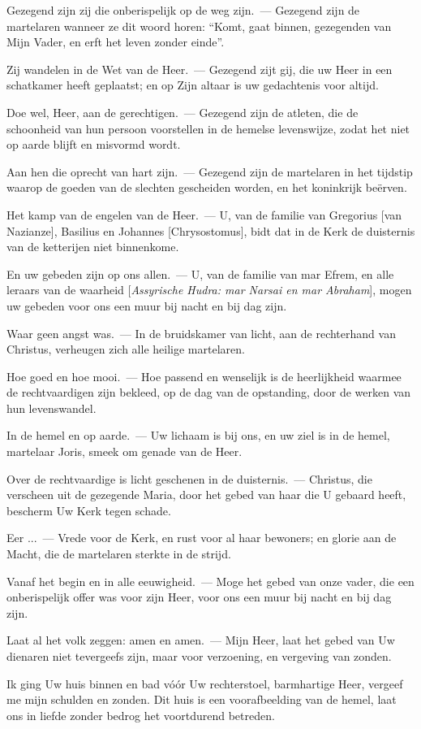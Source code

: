\documentclass[12pt,twoside,a5paper]{article}
\begin{document}
\begin{halfparskip}
  Gezegend zijn zij die onberispelijk op de weg zijn.~--- Gezegend zijn de martelaren wanneer ze dit woord horen: ``Komt, gaat binnen, gezegenden van Mijn Vader, en erft het leven zonder einde''.

  Zij wandelen in de Wet van de Heer.~--- Gezegend zijt gij, die uw Heer in een schatkamer heeft geplaatst; en op Zijn altaar is uw gedachtenis voor altijd.

  Doe wel, Heer, aan de gerechtigen.~--- Gezegend zijn de atleten, die de schoonheid van hun persoon voorstellen in de hemelse levenswijze, zodat het niet op aarde blijft en misvormd wordt.

  Aan hen die oprecht van hart zijn.~--- Gezegend zijn de martelaren in het tijdstip waarop de goeden van de slechten gescheiden worden, en het koninkrijk beërven.

  Het kamp van de engelen van de Heer.~--- U, van de familie van Gregorius [van Nazianze], Basilius en Johannes [Chrysostomus], bidt dat in de Kerk de duisternis van de ketterijen niet binnenkome.

  En uw gebeden zijn op ons allen.~--- U, van de familie van mar Efrem, en alle leraars van de waarheid [\emph{Assyrische Hudra: mar Narsai en mar Abraham}], mogen uw gebeden voor ons een muur bij nacht en bij dag zijn.

  Waar geen angst was.~--- In de bruidskamer van licht, aan de rechterhand van Christus, verheugen zich alle heilige martelaren.

  Hoe goed en hoe mooi.~--- Hoe passend en wenselijk is de heerlijkheid waarmee de rechtvaardigen zijn bekleed, op de dag van de opstanding, door de werken van hun levenswandel.

  In de hemel en op aarde.~--- Uw lichaam is bij ons, en uw ziel is in de hemel, martelaar Joris, smeek om genade van de Heer.

  Over de rechtvaardige is licht geschenen in de duisternis.~--- Christus, die verscheen uit de gezegende Maria, door het gebed van haar die U gebaard heeft, bescherm Uw Kerk tegen schade.

  Eer ...~--- Vrede voor de Kerk, en rust voor al haar bewoners; en glorie aan de Macht, die de martelaren sterkte in de strijd.

  Vanaf het begin en in alle eeuwigheid.~--- Moge het gebed van onze vader, die een onberispelijk offer was voor zijn Heer, voor ons een muur bij nacht en bij dag zijn.

  Laat al het volk zeggen: amen en amen.~--- Mijn Heer, laat het gebed van Uw dienaren niet tevergeefs zijn, maar voor verzoening, en vergeving van zonden.

  Ik ging Uw huis binnen en bad vóór Uw rechterstoel, barmhartige Heer, vergeef me mijn schulden en zonden. Dit huis is een voorafbeelding van de hemel, laat ons in liefde zonder bedrog het voortdurend betreden.
\end{halfparskip}
\end{document}
